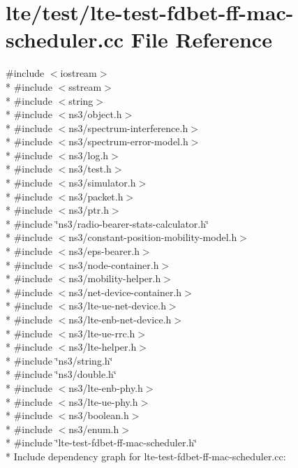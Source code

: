 \hypertarget{lte-test-fdbet-ff-mac-scheduler_8cc}{}\section{lte/test/lte-\/test-\/fdbet-\/ff-\/mac-\/scheduler.cc File Reference}
\label{lte-test-fdbet-ff-mac-scheduler_8cc}
{\ttfamily \#include $<$iostream$>$}\\*
{\ttfamily \#include $<$sstream$>$}\\*
{\ttfamily \#include $<$string$>$}\\*
{\ttfamily \#include $<$ns3/object.\+h$>$}\\*
{\ttfamily \#include $<$ns3/spectrum-\/interference.\+h$>$}\\*
{\ttfamily \#include $<$ns3/spectrum-\/error-\/model.\+h$>$}\\*
{\ttfamily \#include $<$ns3/log.\+h$>$}\\*
{\ttfamily \#include $<$ns3/test.\+h$>$}\\*
{\ttfamily \#include $<$ns3/simulator.\+h$>$}\\*
{\ttfamily \#include $<$ns3/packet.\+h$>$}\\*
{\ttfamily \#include $<$ns3/ptr.\+h$>$}\\*
{\ttfamily \#include \char`\"{}ns3/radio-\/bearer-\/stats-\/calculator.\+h\char`\"{}}\\*
{\ttfamily \#include $<$ns3/constant-\/position-\/mobility-\/model.\+h$>$}\\*
{\ttfamily \#include $<$ns3/eps-\/bearer.\+h$>$}\\*
{\ttfamily \#include $<$ns3/node-\/container.\+h$>$}\\*
{\ttfamily \#include $<$ns3/mobility-\/helper.\+h$>$}\\*
{\ttfamily \#include $<$ns3/net-\/device-\/container.\+h$>$}\\*
{\ttfamily \#include $<$ns3/lte-\/ue-\/net-\/device.\+h$>$}\\*
{\ttfamily \#include $<$ns3/lte-\/enb-\/net-\/device.\+h$>$}\\*
{\ttfamily \#include $<$ns3/lte-\/ue-\/rrc.\+h$>$}\\*
{\ttfamily \#include $<$ns3/lte-\/helper.\+h$>$}\\*
{\ttfamily \#include \char`\"{}ns3/string.\+h\char`\"{}}\\*
{\ttfamily \#include \char`\"{}ns3/double.\+h\char`\"{}}\\*
{\ttfamily \#include $<$ns3/lte-\/enb-\/phy.\+h$>$}\\*
{\ttfamily \#include $<$ns3/lte-\/ue-\/phy.\+h$>$}\\*
{\ttfamily \#include $<$ns3/boolean.\+h$>$}\\*
{\ttfamily \#include $<$ns3/enum.\+h$>$}\\*
{\ttfamily \#include \char`\"{}lte-\/test-\/fdbet-\/ff-\/mac-\/scheduler.\+h\char`\"{}}\\*
Include dependency graph for lte-\/test-\/fdbet-\/ff-\/mac-\/scheduler.cc\+:
